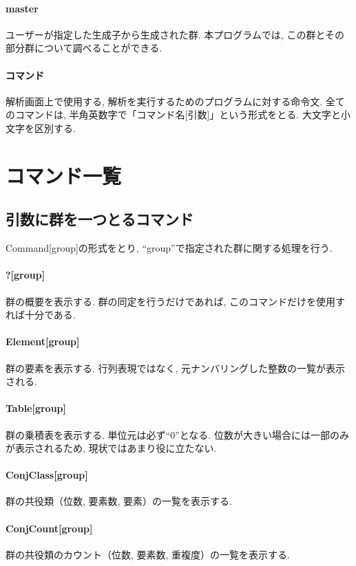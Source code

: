 \documentclass[11pt, a4paper]{jsarticle}
\begin{document}
\paragraph{master}
ユーザーが指定した生成子から生成された群.
本プログラムでは, この群とその部分群について調べることができる.

\paragraph{コマンド}
解析画面上で使用する, 解析を実行するためのプログラムに対する命令文.
全てのコマンドは, 半角英数字で「コマンド名[引数]」という形式をとる.
大文字と小文字を区別する.

\section{コマンド一覧}

\subsection{引数に群を一つとるコマンド}
Command[group]の形式をとり, ``group''で指定された群に関する処理を行う.

\paragraph{?[group]}
群の概要を表示する.
群の同定を行うだけであれば, このコマンドだけを使用すれば十分である.

\paragraph{Element[group]}
群の要素を表示する.
行列表現ではなく, 元ナンバリングした整数の一覧が表示される.

\paragraph{Table[group]}
群の乗積表を表示する.
単位元は必ず``0''となる.
位数が大きい場合には一部のみが表示されるため, 現状ではあまり役に立たない.

\paragraph{ConjClass[group]}
群の共役類（位数, 要素数, 要素）の一覧を表示する.

\paragraph{ConjCount[group]}
群の共役類のカウント（位数, 要素数, 重複度）の一覧を表示する.
\end{document}
